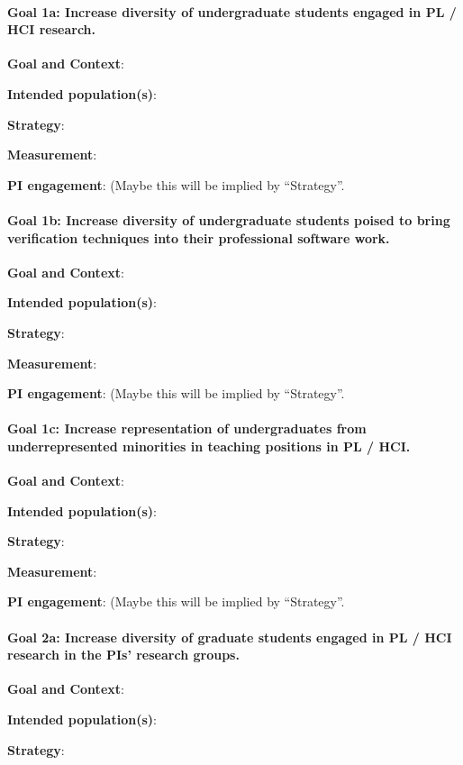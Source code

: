 \paragraph*{Goal 1a: Increase diversity of undergraduate students engaged in PL
/ HCI research.}

\textbf{Goal and Context}: 

\textbf{Intended population(s)}: 

\textbf{Strategy}:

\textbf{Measurement}:

\textbf{PI engagement}: (Maybe this will be implied by ``Strategy''.

\paragraph*{Goal 1b: Increase diversity of undergraduate students poised to
bring verification techniques into their professional software work.}

\textbf{Goal and Context}:

\textbf{Intended population(s)}:

\textbf{Strategy}:

\textbf{Measurement}:

\textbf{PI engagement}: (Maybe this will be implied by ``Strategy''.

\paragraph*{Goal 1c: Increase representation of undergraduates from
underrepresented minorities in teaching positions in PL / HCI.}

\textbf{Goal and Context}:

\textbf{Intended population(s)}:

\textbf{Strategy}:

\textbf{Measurement}:

\textbf{PI engagement}: (Maybe this will be implied by ``Strategy''.

\paragraph*{Goal 2a: Increase diversity of graduate students engaged in PL / HCI
research in the PIs' research groups.}

\textbf{Goal and Context}:

\textbf{Intended population(s)}:

\textbf{Strategy}:

